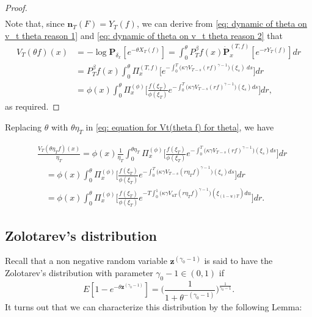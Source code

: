 \documentclass[12pt, a4paper]{amsart}
\theoremstyle{definition}
\numberwithin{equation}{section}
\begin{document}
\begin{proof}
\[\begin{split}
\end{split}\]
	Note that, since $\mathbf n_T(F)= Y_T(f)$, we can derive from \eqref{eq: dynamic of theta on v_t theta reason 1} and \eqref{eq: dynamic of theta on v_t theta reason 2} that
\[\begin{split}
	V_T(\theta f)(x)
	&= -\log \mathbf P_{\delta_x}[e^{-\theta X_T(f)}]
	= \int_0^\theta
P^\beta_Tf(x)
	\dot {\mathbf P}_x^{(T,f)}[e^{-r  Y_T(f)}] dr
	\\&=P^\beta_Tf(x)\int_0^\theta \Pi_x^{(T,f)} \big[e^{-\int_0^T \big(\kappa\gamma V_{T-s}(r f)^{\gamma-1}\big)(\xi_s)~ds}\big] dr
	\\&= \phi( x) \int_0^\theta \Pi_x^{(\phi)} \Big[ \frac{ f(\xi_T) } { \phi(\xi_T) } e^{ - \int_0^T \big( \kappa \gamma V_{T-s} (r f)^{ \gamma - 1} \big) ( \xi_s) ds} \Big] dr,
\end{split}\]
as required.
\end{proof}

	Replacing $\theta$ with $\theta \eta_T$ in \eqref{eq: equation for Vt(theta f) for theta}, we have

\[\label{eq: equation for normalized V_T}\begin{split}
	&\frac{V_T(\theta \eta_T f)(x)}{\eta_T}
	= \phi(x) \frac{1}{\eta_T}\int_0^{\theta \eta_T} \Pi_x^{(\phi)} \Big[ \frac { f(\xi_T) } { \phi(\xi_T) } e^{-\int_0^T \big(\kappa\gamma V_{T-s}(r f)^{\gamma-1}\big)(\xi_s) ds}\Big] dr
	\\&\quad = \phi(x) \int_0^{\theta} \Pi_x^{(\phi)} \Big[ \frac { f(\xi_T) } { \phi(\xi_T) }  e^{-\int_0^T \big(\kappa\gamma V_{T-s}(r \eta_T f)^{\gamma-1}\big)(\xi_s) ds}\Big] dr
	\\&\quad = \phi(x)\int_0^{\theta} \Pi_x^{(\phi)} \Big[\frac{f(\xi_T)}{\phi(\xi_T)} e^{-T\int_0^1 \big(\kappa\gamma V_{uT}(r \eta_T f)^{\gamma-1}\big)(\xi_{(1-u)T}) du}\Big] dr.
\end{split}\]

\subsection{Zolotarev's distribution}
\label{sec: Characterizing the Zolotarev's distribution using an non-linear delay equation}

	Recall that a non negative random variable $\mathbf z^{(\gamma_0 - 1)}$ is said to have the Zolotarev's distribution with parameter $\gamma_0 - 1 \in (0,1)$ if
\[
	E[1-e^{-\theta\mathbf z^{(\gamma_0 - 1)}}]
	=\Big( \frac{1}{1+\theta^{-(\gamma_0 - 1)}} \Big)^{\frac{1}{\gamma_0 - 1}}.
\]
	It turns out that we can characterize this distribution by the following Lemma:
\end{document}
